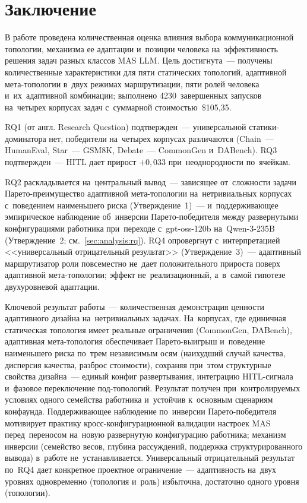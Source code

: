 
\section*{Заключение}

В работе проведена количественная оценка влияния выбора
коммуникационной топологии, механизма ее адаптации и~позиции
человека на~эффективность решения задач разных классов MAS LLM.
Цель достигнута~--- получены количественные характеристики для
пяти статических топологий, адаптивной мета-топологии в~двух
режимах маршрутизации, пяти ролей человека и~их~адаптивной
комбинации; выполнено 4230~завершенных запусков на~четырех корпусах
задач с~суммарной стоимостью~\$105{,}35.

RQ1 (от англ. Research Question) подтвержден~--- универсальной
статики-доминатора нет, победители на~четырех корпусах различаются
(Chain~--- HumanEval, Star~--- GSM8K, Debate~--- CommonGen и~DABench).
RQ3 подтвержден~--- HITL дает прирост $+0{,}033$ при~неоднородности
по~ячейкам.

RQ2 раскладывается на~центральный вывод~--- зависящее от~сложности
задачи Парето-преимущество адаптивной мета-топологии на~нетривиальных
корпусах с~поведением наименьшего риска (Утверждение~1)~---
и~поддерживающее эмпирическое наблюдение об~инверсии Парето-победителя
между развернутыми конфигурациями работника при~переходе с~gpt-oss-120b
на~Qwen-3-235B (Утверждение~2; см.~\ref{sec:analysis:rq}). RQ4
опровергнут с~интерпретацией <<универсальный отрицательный результат>>
(Утверждение~3)~--- адаптивный маршрутизатор роли повсеместно
не~дает положительного прироста поверх адаптивной мета-топологии;
эффект не~реализационный, а~в~самой гипотезе двухуровневой адаптации.

Ключевой результат работы~--- количественная демонстрация ценности
адаптивного дизайна на~нетривиальных задачах. На~корпусах, где
единичная статическая топология имеет реальные ограничения
(CommonGen, DABench), адаптивная мета-топология обеспечивает
Парето-выигрыш и~поведение наименьшего риска по~трем независимым
осям (наихудший случай качества, дисперсия качества, разброс
стоимости), сохраняя при~этом структурные свойства дизайна~--- единый
конфиг развертывания, интеграцию HITL-сигнала и~фазовое переключение
под-топологий. Результат получен при~контролируемых условиях
одного семейства работника и~устойчив к~основным сценариям
конфаунда. Поддерживающее наблюдение по~инверсии Парето-победителя
мотивирует практику кросс-конфигурационной валидации настроек MAS
перед~переносом на~новую развернутую конфигурацию работника;
механизм инверсии (семейство весов, глубина рассуждений, поддержка
структурированного вывода) в~работе не~устанавливается. Универсальный
отрицательный результат по~RQ4 дает конкретное проектное
ограничение~--- адаптивность на~двух уровнях одновременно (топология
и~роль) избыточна, достаточно одного уровня (топологии).

